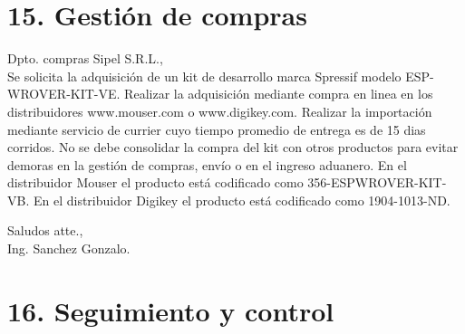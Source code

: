 \documentclass[11pt]{charter}
\begin{document}
\section{15. Gestión de compras}
\label{sec:compras}

Dpto. compras Sipel S.R.L., \\
Se solicita la adquisición de un kit de desarrollo marca Spressif modelo ESP-WROVER-KIT-VE. Realizar la adquisición 	mediante compra en linea en los distribuidores www.mouser.com o www.digikey.com.	Realizar la importación mediante servicio de currier cuyo tiempo promedio de entrega es de 15 dias corridos. No se debe consolidar la compra del kit con otros productos para evitar demoras en la gestión de compras, envío o en el ingreso aduanero.
En el distribuidor Mouser el producto está codificado como 356-ESPWROVER-KIT-VB. En el distribuidor Digikey el producto está codificado como 1904-1013-ND.

Saludos atte.,\\
Ing. Sanchez Gonzalo.

\section{16. Seguimiento y control}
\label{sec:seguimiento}

%
%
\end{document}

